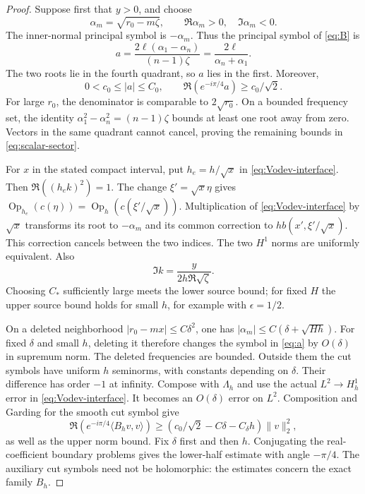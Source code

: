 \documentclass[11pt,a4paper]{article}
\DeclareMathOperator{\Op}{Op}
\theoremstyle{remark}
\numberwithin{equation}{section}
\begin{document}
\begin{proof}
Suppose first that $y>0$, and choose
\[
 \alpha_m=\sqrt{r_0-m\zeta},\qquad \Re\alpha_m>0,\quad\Im\alpha_m<0.
\]
The inner-normal principal symbol is $-\alpha_m$. Thus the principal
symbol of \eqref{eq:B} is
\begin{equation}\label{eq:a}
 a=\frac{2\ell(\alpha_1-\alpha_n)}{(n-1)\zeta}
   =\frac{2\ell}{\alpha_n+\alpha_1}.
\end{equation}
The two roots lie in the fourth quadrant, so $a$ lies in the first.
Moreover,
\begin{equation}\label{eq:scalar-sector}
 0<c_0\le|a|\le C_0,\qquad
 \Re(e^{-i\pi/4}a)\ge c_0/\sqrt2.
\end{equation}
For large $r_0$, the denominator is comparable to $2\sqrt{r_0}$.
On a bounded frequency set, the identity
$\alpha_1^2-\alpha_n^2=(n-1)\zeta$ bounds at least one root away
from zero. Vectors in the same quadrant cannot cancel, proving the
remaining bounds in \eqref{eq:scalar-sector}.

For $x$ in the stated compact interval, put $h_e=h/\sqrt x$ in
\eqref{eq:Vodev-interface}. Then $\Re((h_e k)^2)=1$. The change
$\xi'=\sqrt x\eta$ gives
$\Op_{h_e}(c(\eta))=\Op_h(c(\xi'/\sqrt x))$.
Multiplication of \eqref{eq:Vodev-interface} by $\sqrt x$ transforms
its root to $-\alpha_m$ and its common correction to
$hb(x',\xi'/\sqrt x)$. This correction cancels between the two
indices. The two $H^1$ norms are uniformly equivalent. Also
\[
 \Im k=\frac{y}{2h\Re\sqrt\zeta}.
\]
Choosing $C_*$ sufficiently large meets the lower source bound; for
fixed $H$ the upper source bound holds for small $h$, for example with
$\epsilon=1/2$.

On a deleted neighborhood $|r_0-mx|\le C\delta^2$, one has
$|\alpha_m|\le C(\delta+\sqrt{Hh})$. For fixed $\delta$ and small
$h$, deleting it therefore changes the symbol in \eqref{eq:a} by
$O(\delta)$ in supremum norm. The deleted frequencies are bounded.
Outside them the cut symbols have uniform $h$ seminorms, with constants
depending on $\delta$. Their difference has order $-1$ at infinity.
Compose with $\Lambda_h$ and use the actual $L^2\to H_h^1$ error
in \eqref{eq:Vodev-interface}. It becomes an $O(\delta)$ error on
$L^2$. Composition and Garding for the smooth cut symbol give
\[
 \Re(e^{-i\pi/4}\langle B_hv,v\rangle)
 \ge(c_0/\sqrt2-C\delta-C_\delta h)\|v\|_2^2,
\]
as well as the upper norm bound. Fix $\delta$ first and then $h$.
Conjugating the real-coefficient boundary problems gives the lower-half
estimate with angle $-\pi/4$. The auxiliary cut symbols need not be
holomorphic: the estimates concern the exact family $B_h$.
\end{proof}
\end{document}

